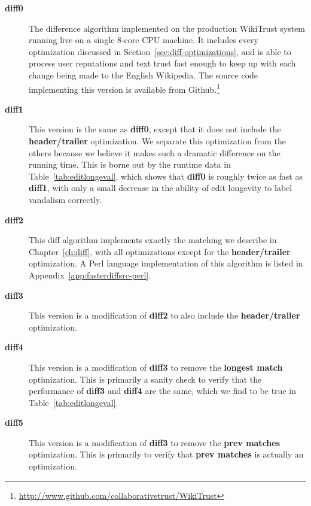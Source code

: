 \begin{description}

\item[\textbf{diff0}] The difference algorithm implemented on the production
    WikiTrust system running live on a single 8-core CPU machine.
    It includes every optimization discussed in
    Section~\ref{sec:diff-optimizations},
    and is able to process user reputations and text trust fast enough
    to keep up with each change being made to the English Wikipedia.
    The source code implementing this version is available from
    Github.\footnote{\url{http://www.github.com/collaborativetrust/WikiTrust}}

\item[\textbf{diff1}] This version is the same as \textbf{diff0},
    except that it does not include the \textbf{header/trailer}
    optimization.
    We separate this optimization from the others because we believe
    it makes such a dramatic difference on the running time.
    This is borne out by the runtime data in Table~\ref{tab:editlongeval},
    which shows that \textbf{diff0} is roughly twice as fast
    as \textbf{diff1}, with only a small decrease in the
    ability of edit longevity to label vandalism correctly.

\item[\textbf{diff2}] This diff algorithm implements exactly the matching
    we describe in Chapter~\ref{ch:diff}, with all optimizations except
    for the \textbf{header/trailer} optimization.
    A Perl language implementation of
    this algorithm is listed in Appendix~\ref{app:fasterdiffsrc-perl}.

\item[\textbf{diff3}] This version is a modification of \textbf{diff2}
    to also include the \textbf{header/trailer} optimization.

\item[\textbf{diff4}] This version is a modification of \textbf{diff3}
    to remove the \textbf{longest match} optimization.
    This is primarily a sanity check to verify that the performance
    of \textbf{diff3} and \textbf{diff4} are the same, which
    we find to be true in Table~\ref{tab:editlongeval}.

\item[\textbf{diff5}] This version is a modification of \textbf{diff3}
    to remove the \textbf{prev matches} optimization.
    This is primarily to verify that \textbf{prev matches} is
    actually an optimization.

\end{description}



